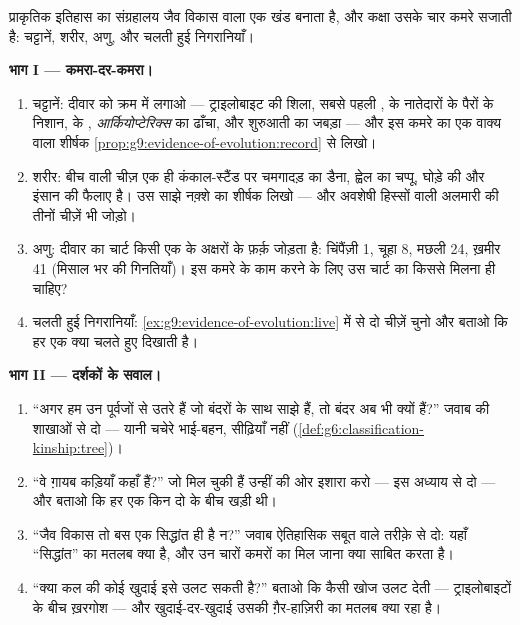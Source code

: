 \begin{problem}[{सप्ताहांत समस्या --- सबूतों का कक्ष
सजाना}]\label{pb:g9:evidence-of-evolution:1}
प्राकृतिक इतिहास का संग्रहालय जैव विकास वाला एक खंड बनाता है, और कक्षा
उसके चार कमरे सजाती है: चट्टानें, शरीर, अणु, और चलती हुई निगरानियाँ।

\medskip\noindent\textbf{भाग I --- कमरा-दर-कमरा।}
\begin{enumerate}
  \item चट्टानें: दीवार को क्रम में लगाओ --- ट्राइलोबाइट की शिला, सबसे
        पहली ,  के नातेदारों के पैरों के निशान, 
        के , \emph{आर्कियोप्टेरिक्स} का ढाँचा, और शुरुआती
         का जबड़ा --- और इस कमरे का एक वाक्य वाला शीर्षक
        \cref{prop:g9:evidence-of-evolution:record} से लिखो।
  \item शरीर: बीच वाली चीज़ एक ही कंकाल-स्टैंड पर चमगादड़ का डैना,
        ह्वेल का चप्पू, घोड़े की  और इंसान की  फैलाए है। उस
        साझे नक़्शे का शीर्षक लिखो --- और अवशेषी हिस्सों वाली अलमारी
        की तीनों चीज़ें भी जोड़ो।
  \item अणु: दीवार का चार्ट किसी एक  के अक्षरों के फ़र्क़ जोड़ता है:
        चिंपैंज़ी 1, चूहा 8, मछली 24, ख़मीर 41 (मिसाल भर की गिनतियाँ)।
        इस कमरे के काम करने के लिए उस चार्ट का  किससे मिलना ही
        चाहिए?
  \item चलती हुई निगरानियाँ: \cref{ex:g9:evidence-of-evolution:live}
        में से दो चीज़ें चुनो और बताओ कि हर एक क्या चलते हुए दिखाती
        है।
\end{enumerate}

\medskip\noindent\textbf{भाग II --- दर्शकों के सवाल।}
\begin{enumerate}[resume]
  \item ``अगर हम उन पूर्वजों से उतरे हैं जो बंदरों के साथ साझे हैं, तो
        बंदर अब भी क्यों हैं?'' जवाब  की शाखाओं से दो --- यानी
        चचेरे भाई-बहन, सीढ़ियाँ नहीं
        (\cref{def:g6:classification-kinship:tree})।
  \item ``वे ग़ायब कड़ियाँ कहाँ हैं?'' जो मिल चुकी हैं उन्हीं की ओर
        इशारा करो --- इस अध्याय से दो --- और बताओ कि हर एक किन दो के
        बीच खड़ी थी।
  \item ``जैव विकास तो बस एक सिद्धांत ही है न?'' जवाब ऐतिहासिक सबूत
        वाले तरीक़े से दो: यहाँ ``सिद्धांत'' का मतलब क्या है, और उन
        चारों कमरों का मिल जाना क्या साबित करता है।
  \item ``क्या कल की कोई खुदाई इसे उलट सकती है?'' बताओ कि कैसी खोज
        उलट देती --- ट्राइलोबाइटों के बीच ख़रगोश --- और खुदाई-दर-खुदाई
        उसकी ग़ैर-हाज़िरी का मतलब क्या रहा है।
\end{enumerate}


\end{problem}

